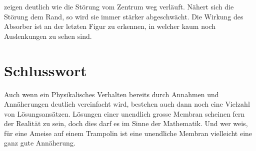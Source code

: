 zeigen deutlich wie die Störung vom Zentrum weg verläuft.
Nähert sich die Störung dem Rand, so wird sie immer stärker abgeschwächt.
Die Wirkung des Absorber ist an der letzten Figur zu erkennen, in welcher kaum noch Auslenkungen zu sehen sind.

\section{Schlusswort}
Auch wenn ein Physikalisches Verhalten bereits durch Annahmen und Annäherungen deutlich vereinfacht wird, bestehen auch dann noch eine Vielzahl von Lösungsansätzen.
Lösungen einer unendlich grosse Membran scheinen fern der Realität zu sein, doch dies darf es im Sinne der Mathematik.
Und wer weis, für eine Ameise auf einem Trampolin ist eine unendliche Membran vielleicht eine ganz gute Annäherung. 








